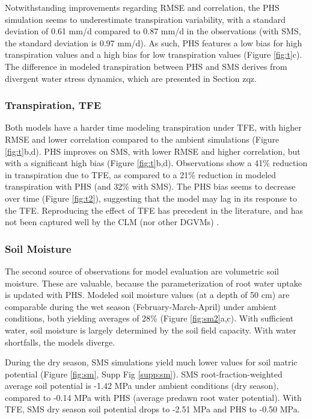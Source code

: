 \documentclass[draft,linenumbers]{agujournal}
\begin{document}
Notwithstanding improvements regarding RMSE and correlation, the PHS simulation seems to underestimate transpiration variability, with a standard deviation of 0.61 mm/d compared to 0.87 mm/d in the observations (with SMS, the standard deviation is 0.97 mm/d).
As such, PHS features a low bias for high transpiration values and a high bias for low transpiration values (Figure \ref{fig:t}c).
The difference in modeled transpiration between PHS and SMS derives from divergent water stress dynamics, which are presented in Section zqz.

\subsubsection{Transpiration, TFE}
Both models have a harder time modeling transpiration under TFE, with higher RMSE and lower correlation compared to the ambient simulations (Figure \ref{fig:t}b,d).
PHS improves on SMS, with lower RMSE and higher correlation, but with a significant high bias (Figure \ref{fig:t}b,d).
Observations show a 41\% reduction in transpiration due to TFE, as compared to a 21\% reduction in modeled transpiration with PHS (and 32\% with SMS).
The PHS bias seems to decrease over time (Figure \ref{fig:t2}), suggesting that the model may lag in its response to the TFE.
Reproducing the effect of TFE has precedent in the literature, and has not been captured well by the CLM (nor other DGVMs) \citep{restrepo2017,powell2013}.

\subsubsection{Soil Moisture}
The second source of observations for model evaluation are volumetric soil moisture. 
These are valuable, because the parameterization of root water uptake is updated with PHS.
Modeled soil moisture values (at a depth of 50 cm) are comparable during the wet season (February-March-April) under ambient conditions, both yielding averages of 28\% (Figure \ref{fig:sm2}a,c).
With sufficient water, soil moisture is largely determined by the soil field capacity.
With water shortfalls, the models diverge.


    During the dry season, SMS simulations yield much lower values for soil matric potential (Figure \ref{fig:sm}, Supp Fig \ref{supp:sm}). 
    SMS root-fraction-weighted average soil potential is -1.42 MPa under ambient conditions (dry season), compared to -0.14 MPa with PHS (average predawn root water potential).
    With TFE, SMS dry season soil potential drops to -2.51 MPa and PHS to -0.50 MPa.
\end{document}
